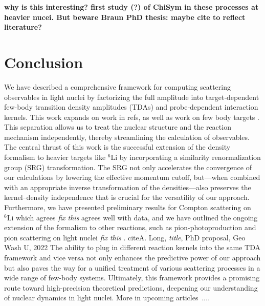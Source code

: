 \documentclass[a4paper,11pt]{article}
\newcommand{\LiS}{{}^{6} \mathrm{Li} }
\newcommand{\ques}[1]{\color{red}\textit{ #1 }\color{black}}
\newcommand{\com}[1]{\color{blue}\small\textbf{ #1 }\color{black}\normalsize}
\renewcommand{\emph}[1]{\textit{#1}}           %
\renewcommand{\emph}[1]{\textit{#1}}           %
\begin{document}
\com{why is this interesting? first study (?) of ChiSym in these processes at heavier nucei. But beware Braun PhD thesis: maybe cite to reflect literature?}

\section{Conclusion}
We have described a comprehensive framework for
computing scattering observables in light nuclei by factorizing the
full amplitude into target‐dependent few-body transition density
amplitudes (TDAs) and probe‐dependent interaction kernels. 
This work expands on work in refs, as well as work on few body targets \cite{hammer2020,hammer4He,L2013}.
This separation allows us to treat the nuclear structure and the
reaction mechanism independently, thereby streamlining the
calculation of observables.
The central thrust of this work is the successful extension of
the density formalism to heavier targets like $\LiS$ by incorporating a
similarity renormalization group (SRG) transformation.
The SRG not only accelerates the convergence of our calculations by
lowering the effective momentum cutoff, but—when combined with an
appropriate inverse transformation of the densities—also preserves
the kernel–density independence that is crucial for the versatility
of our approach.
Furthermore, we have presented preliminary results for Compton scattering on
$\LiS$ which agrees
\ques{fix this}
agrees well with data, and we have outlined the ongoing extension of the formalism to other
reactions, such as pion-photoproduction and pion scattering on light nuclei\ques{fix this}\cite{upcoming} . cite{A. Long, \emph{title}, PhD proposal, Geo Wash U, 2022}%
The ability to plug in different reaction kernels into the same TDA
framework and vice versa not only enhances the predictive power of our approach but
also paves the way for a unified treatment of various scattering
processes in a wide range of few-body systems.
Ultimately, this framework provides a promising route toward
high-precision theoretical predictions, deepening our understanding
of nuclear dynamics in light nuclei. More in upcoming articles~\cite{upcoming}....
\end{document}
